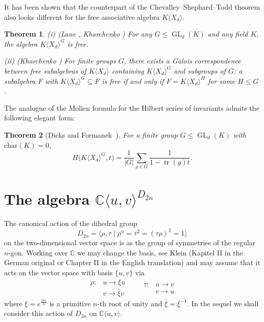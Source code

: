 \documentclass{amsart}[12pt]
\newtheorem{theorem}{Theorem}%
\theoremstyle{definition}
\DeclareMathOperator{\GL}{GL}
\DeclareMathOperator{\tr}{tr}
\newcommand{\KXd}{K\langle X_d\rangle}
\newcommand{\CuvD}{{\mathbb C}\langle u,v\rangle^{D_{2n}}}
\begin{document}
It has been shown that the counterpart of the Chevalley--Shephard--Todd theorem also looks different for the free associative algebra $K\langle X_d\rangle$.

\begin{theorem}\label{free generation of noncommutative invariants}
{\rm (i) (Lane \cite{La}, Kharchenko \cite{Kh1})} For any $G \leq \GL_d(K)$ and any field $K$, the algebra $\KXd^G$ is free.
		
{\rm (ii) (Kharchenko \cite{Kh1})} For finite groups $G$, there exists a Galois correspondence between free subalgebras of $\KXd$ containing $\KXd^G$ and subgroups of $G$:
a subalgebra $F$ with $\KXd^G \subseteq F$ is free if and only if $F = \KXd^H$ for some $H \leq G$.
\end{theorem}


The analogue of the Molien formula for the Hilbert series of invariants admits the following elegant form:

\begin{theorem} [\label{noncommutatiev Molien formula}{Dicks and Formanek~{\cite{DiFo}}}]
For a finite group $G \leq \GL_d(K)$ with $\mathrm{char}(K) = 0$,
\[
H\big(K\langle X_d\rangle^G,t\big)=\frac{1}{\vert G\vert}\sum_{g\in G}\frac{1}{1-\tr(g)t}.
\]
\end{theorem}


\section{\textbf{The algebra} $\CuvD$}
The canonical action of the dihedral group
\[
D_{2n}=\langle\rho,\tau\mid\rho^n=\tau^2=(\tau\rho)^2=1\rangle
\]
on the two-dimensional vector space is as the group of symmetries of the regular $n$-gon.
Working over $\mathbb C$ we may change the basis, see Klein \cite{Kl} (Kapitel II in the German original or Chapter II in the English translation) and may assume that
it acts on the vector space with basis $\{u,v\}$ via
\[
\begin{matrix}
	\rho:&u\to\xi u\\
	& v\to\bar\xi v
\end{matrix}
\ \ \ \ \ \ \ \  \begin{matrix}
	\tau:&u\to v\\
	&v\to u
\end{matrix}
\]
where $\xi=e^{\frac{2\pi i}{n}}$ is a primitive $n$-th root of unity and $\bar\xi=\xi^{-1}$.
In the sequel we shall consider this action of $D_{2n}$ on $\mathbb{C}\langle u,v \rangle$.
\end{document}
